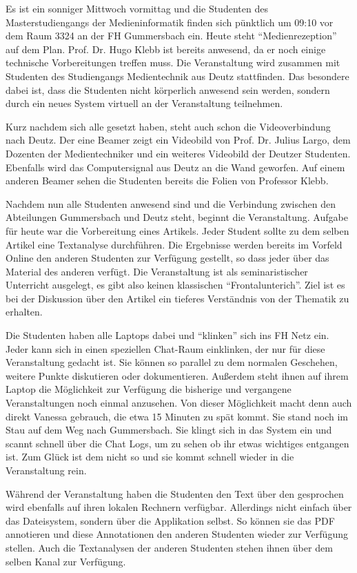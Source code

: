  Es ist ein sonniger Mittwoch vormittag und die Studenten des Masterstudiengangs der Medieninformatik finden sich pünktlich um 09:10 vor dem Raum 3324 an der FH Gummersbach ein. Heute steht "`Medienrezeption"' auf dem Plan. Prof. Dr. Hugo Klebb ist bereits anwesend, da er noch einige technische Vorbereitungen treffen muss. Die Veranstaltung wird zusammen mit Studenten des Studiengangs Medientechnik aus Deutz stattfinden. Das besondere dabei ist, dass die Studenten nicht körperlich anwesend sein werden, sondern durch ein neues System virtuell an der Veranstaltung teilnehmen.

  Kurz nachdem sich alle gesetzt haben, steht auch schon die Videoverbindung nach Deutz. Der eine Beamer zeigt ein Videobild von Prof. Dr. Julius Largo, dem Dozenten der Medientechniker und ein weiteres Videobild der Deutzer Studenten. Ebenfalls wird das Computersignal aus Deutz an die Wand geworfen. Auf einem anderen Beamer sehen die Studenten bereits die Folien von Professor Klebb.

  Nachdem nun alle Studenten anwesend sind und die Verbindung zwischen den Abteilungen Gummersbach und Deutz steht, beginnt die Veranstaltung. Aufgabe für heute war die Vorbereitung eines Artikels. Jeder Student sollte zu dem selben Artikel eine Textanalyse durchführen. Die Ergebnisse werden bereits im Vorfeld Online den anderen Studenten zur Verfügung gestellt, so dass jeder über das Material des anderen verfügt. Die Veranstaltung ist als seminaristischer Unterricht ausgelegt, es gibt also keinen klassischen "`Frontalunterich"'. Ziel ist es bei der Diskussion über den Artikel ein tieferes Verständnis von der Thematik zu erhalten.

  Die Studenten haben alle Laptops dabei und "`klinken"' sich ins FH Netz ein. Jeder kann sich in einen speziellen Chat-Raum einklinken, der nur für diese Veranstaltung gedacht ist. Sie können so parallel zu dem normalen Geschehen, weitere Punkte diskutieren oder dokumentieren. Außerdem steht ihnen auf ihrem Laptop die Möglichkeit zur Verfügung die bisherige und vergangene Veranstaltungen noch einmal anzusehen. Von dieser Möglichkeit macht denn auch direkt Vanessa gebrauch, die etwa 15 Minuten zu spät kommt. Sie stand noch im Stau auf dem Weg nach Gummersbach. Sie klingt sich in das System ein und scannt schnell über die Chat Logs, um zu sehen ob ihr etwas wichtiges entgangen ist. Zum Glück ist dem nicht so und sie kommt schnell wieder in die Veranstaltung rein.

  Während der Veranstaltung haben die Studenten den Text über den gesprochen wird ebenfalls auf ihren lokalen Rechnern verfügbar. Allerdings nicht einfach über das Dateisystem, sondern über die Applikation selbst. So können sie das PDF annotieren und diese Annotationen den anderen Studenten wieder zur Verfügung stellen. Auch die Textanalysen der anderen Studenten stehen ihnen über dem selben Kanal zur Verfügung.

